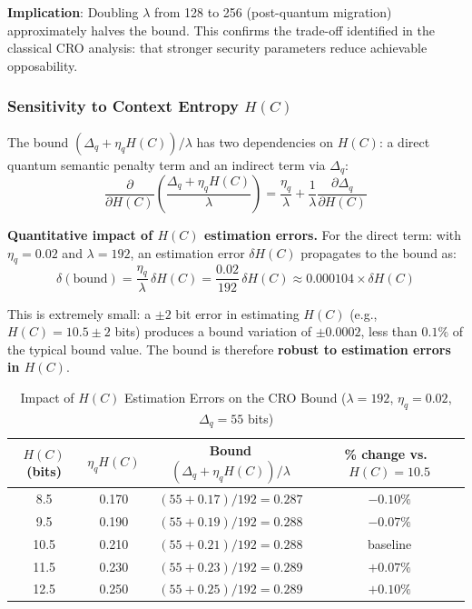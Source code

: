 \documentclass{ieeeaccess}
\begin{document}
\textbf{Implication}: Doubling $\lambda$ from 128 to 256 (post-quantum migration) approximately halves the bound. This confirms the trade-off identified in the classical CRO analysis: that stronger security parameters reduce achievable opposability.

\subsubsection{Sensitivity to Context Entropy $H(C)$}

The bound $(\Delta_q + \eta_q H(C))/\lambda$ has two dependencies 
on $H(C)$: a direct quantum semantic penalty term and an indirect 
term via $\Delta_q$:
\begin{equation}
    \frac{\partial}{\partial H(C)}\left(
    \frac{\Delta_q + \eta_q H(C)}{\lambda}\right) 
    = \frac{\eta_q}{\lambda} 
    + \frac{1}{\lambda}\frac{\partial \Delta_q}{\partial H(C)}
\end{equation}

\textbf{Quantitative impact of $H(C)$ estimation errors.}
For the direct term: with $\eta_q = 0.02$ and $\lambda = 192$, 
an estimation error $\delta H(C)$ propagates to the bound as:
\begin{equation}
    \delta(\text{bound}) = \frac{\eta_q}{\lambda}\, \delta H(C)
    = \frac{0.02}{192}\, \delta H(C) 
    \approx 0.000104 \times \delta H(C)
\end{equation}

This is extremely small: a $\pm 2$ bit error in estimating $H(C)$ 
(e.g., $H(C) = 10.5 \pm 2$ bits) produces a bound variation of 
$\pm 0.0002$, less than $0.1\%$ of the typical bound value. 
The bound is therefore \textbf{robust to estimation errors in $H(C)$}.

\begin{table}[h]
\centering
\caption{Impact of $H(C)$ Estimation Errors on the CRO Bound 
($\lambda = 192$, $\eta_q = 0.02$, $\Delta_q = 55$ bits)}
\label{tab:hc_sensitivity}
\setlength{\tabcolsep}{5pt}
\small
\begin{tabular}{cccc}
\toprule
$H(C)$ (bits) & $\eta_q H(C)$ & Bound $(\Delta_q + \eta_q H(C))/\lambda$ 
  & \% change vs.\ $H(C)=10.5$ \\
\midrule
8.5  & 0.170 & $(55 + 0.17)/192 = 0.287$ & $-0.10\%$ \\
9.5  & 0.190 & $(55 + 0.19)/192 = 0.288$ & $-0.07\%$ \\
10.5 & 0.210 & $(55 + 0.21)/192 = 0.288$ & baseline \\
11.5 & 0.230 & $(55 + 0.23)/192 = 0.289$ & $+0.07\%$ \\
12.5 & 0.250 & $(55 + 0.25)/192 = 0.289$ & $+0.10\%$ \\
\bottomrule
\end{tabular}
\end{table}
\end{document}

